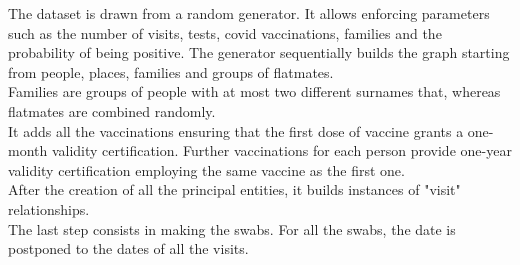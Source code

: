 The dataset is drawn from a random generator. It allows enforcing parameters such as the number of visits, tests, covid vaccinations, families and the probability of being positive.
The generator sequentially builds the graph starting from people, places, families and groups of flatmates. \\
Families are groups of people with at most two different surnames that, whereas flatmates are combined randomly. \\
It adds all the vaccinations ensuring that the first dose of vaccine grants a one-month validity certification. Further vaccinations for each person provide one-year validity certification employing the same vaccine as the first one. \\
After the creation of all the principal entities, it builds instances of "visit"  relationships. \\
The last step consists in making the swabs. For all the swabs, the date is postponed to the dates of all the visits.

